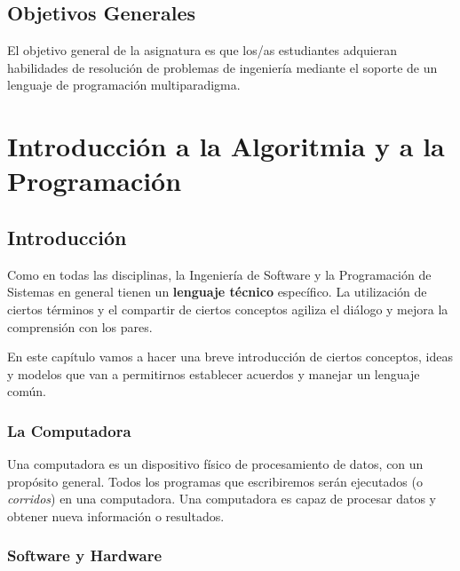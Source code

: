 \documentclass[
  letterpaper,
  DIV=11,
  numbers=noendperiod]{scrreprt}
\begin{document}
\hypertarget{objetivos-generales}{%
\section*{Objetivos Generales}\label{objetivos-generales}}


El objetivo general de la asignatura es que los/as estudiantes adquieran
habilidades de resolución de problemas de ingeniería mediante el soporte
de un lenguaje de programación multiparadigma.


\hypertarget{introducciuxf3n-a-la-algoritmia-y-a-la-programaciuxf3n}{%
\chapter{Introducción a la Algoritmia y a la
Programación}\label{introducciuxf3n-a-la-algoritmia-y-a-la-programaciuxf3n}}

\hypertarget{introducciuxf3n}{%
\section{Introducción}\label{introducciuxf3n}}

Como en todas las disciplinas, la Ingeniería de Software y la
Programación de Sistemas en general tienen un \textbf{lenguaje técnico}
específico. La utilización de ciertos términos y el compartir de ciertos
conceptos agiliza el diálogo y mejora la comprensión con los pares.

En este capítulo vamos a hacer una breve introducción de ciertos
conceptos, ideas y modelos que van a permitirnos establecer acuerdos y
manejar un lenguaje común.

\hypertarget{la-computadora}{%
\subsection{La Computadora}\label{la-computadora}}

Una computadora es un dispositivo físico de procesamiento de datos, con
un propósito general. Todos los programas que escribiremos serán
ejecutados (o \emph{corridos}) en una computadora. Una computadora es
capaz de procesar datos y obtener nueva información o resultados.

\hypertarget{software-y-hardware}{%
\subsection{Software y Hardware}\label{software-y-hardware}}
\end{document}
